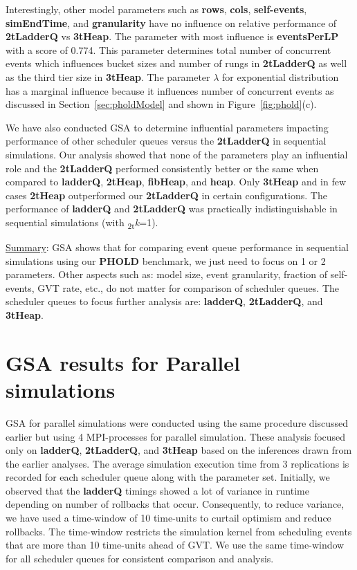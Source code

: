 Interestingly, other model parameters such as \textbf{rows}, \textbf{cols}, \textbf{self-events}, \textbf{simEndTime}, and \textbf{granularity} have no influence on relative performance of \textbf{2tLadderQ} vs \textbf{3tHeap}. The parameter with most influence is \textbf{eventsPerLP} with a score of 0.774. This parameter determines total number of concurrent events which influences bucket sizes and number of rungs in \textbf{2tLadderQ} as well as the third tier size in \textbf{3tHeap}. The parameter $\lambda$ for exponential distribution has a marginal influence because it influences number of concurrent events as discussed in Section~\ref{sec:pholdModel} and shown in Figure~\ref{fig:phold}(c).

We have also conducted GSA to determine influential parameters impacting performance of other scheduler queues versus the \textbf{2tLadderQ} in sequential simulations. Our analysis showed that none of the parameters play an influential role and the \textbf{2tLadderQ} performed consistently better or the same when compared to \textbf{ladderQ}, \textbf{2tHeap}, \textbf{fibHeap}, and \textbf{heap}. Only \textbf{3tHeap} and in few cases \textbf{2tHeap} outperformed our \textbf{2tLadderQ} in certain configurations.  The performance of \textbf{ladderQ} and \textbf{2tLadderQ} was practically indistinguishable in sequential simulations (with \textsubscript{2t}\textit{k}=1).

\underline{Summary}: GSA shows that for comparing event queue performance in sequential simulations using our \textbf{PHOLD} benchmark, we just need to focus on 1 or 2 parameters. Other aspects such as: model size, event granularity, fraction of self-events, GVT rate, etc., do not matter for comparison of scheduler queues. The scheduler queues to focus further analysis are: \textbf{ladderQ}, \textbf{2tLadderQ}, and \textbf{3tHeap}.

\section{GSA results for Parallel simulations}\label{sec:par-gsa}

GSA for parallel simulations were conducted using the same procedure discussed earlier but using 4 MPI-processes for parallel simulation. These analysis focused only on \textbf{ladderQ}, \textbf{2tLadderQ}, and \textbf{3tHeap} based on the inferences drawn from the earlier analyses. The average simulation execution time from 3 replications is recorded for each scheduler queue along with the parameter set.  Initially, we observed that the \textbf{ladderQ} timings showed a lot of variance in runtime depending on number of rollbacks that occur.  Consequently, to reduce variance, we have used a time-window of 10 time-units to curtail optimism and reduce rollbacks.  The time-window restricts the simulation kernel from scheduling events that are more than 10 time-units ahead of GVT.  We use the same time-window for all
scheduler queues for consistent comparison and analysis.

